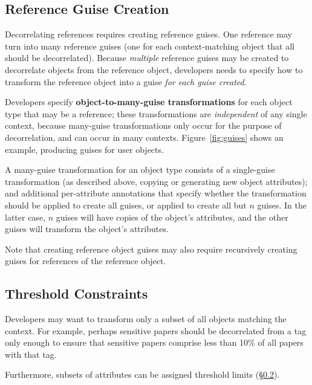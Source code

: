 \subsection{Reference Guise Creation}
\label{sec:reference_guises} 
%
Decorrelating references requires creating reference guises. One reference may turn into many
reference guises (one for each context-matching object that all should be decorrelated).  Because
\emph{multiple} reference guises may be created to decorrelate objects from the reference object,
developers needs to specify how to transform the reference object into a guise \emph{for each guise
created}.

%
Developers specify 
\textbf{object-to-many-guise transformations} for each object type that may be a reference; these
transformations are \emph{independent} of any single context, because many-guise transformations only
occur for the purpose of decorrelation, and can occur in many contexts.
%
Figure~\ref{fig:guises} shows an example, producing guises for user objects.

A many-guise transformation for an object type consists of a single-guise transformation (as
described above, \ie copying or generating new object attributes); and additional per-attribute
annotations that specify whether the transformation should be applied to create all guises, or
applied to create all but $n$ guises. In the latter case, $n$ guises will have copies of the
object's attributes, and the other guises will transform the object's attributes.

Note that creating reference object guises may also require recursively creating guises for references of
the reference object.
%
%

\subsection{Threshold Constraints}
\label{sec:threshold} 

Developers may want to transform only a subset of all objects matching the context. For example,
perhaps sensitive papers should be decorrelated from a tag only enough to ensure that sensitive
papers comprise less than 10\% of all papers with that tag.

Furthermore, subsets of attributes can be assigned threshold limits
(\S\ref{sec:threshold}). 

